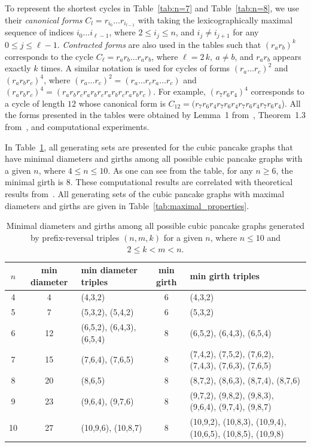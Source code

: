 \documentclass[
final
]{dmtcs-episciences}
\begin{document}
To represent the shortest cycles in Table~\ref{tab:n=7} and Table~\ref{tab:n=8}, we use their {\it canonical forms} $C_{l}=r_{i_0} \ldots r_{i_{l-1}}$ with taking the lexicographically maximal sequence of indices $i_0\ldots i_{\ell-1}$, where $2\leqslant i_j \leqslant n$, and $i_j \neq i_{j+1}$ for any $0\leqslant j \leqslant \ell-1$. {\it Contracted forms} are also used in the tables such that $(r_a r_b)^k$ corresponds to the cycle $C_\ell=r_a r_b\ldots r_a r_b$, where $\ell=2\,k, \ a\neq b$, and $r_a r_b$ appears exactly $k$ times. A similar notation is used for cycles of forms $(r_a\ldots r_c)^2$ and $(r_ar_br_c)^4$, where $(r_a\ldots r_c)^2=(r_a\ldots r_cr_a\ldots r_c)$ and $(r_ar_br_c)^4=(r_ar_br_cr_ar_br_cr_ar_br_cr_ar_br_c)$. For example, $(r_7r_6r_4)^4$ corresponds to a cycle of length $12$ whose canonical form is $C_{12}=(r_7r_6r_4r_7r_6r_4r_7r_6r_4r_7r_6r_4$). All the forms presented in the tables were obtained by Lemma~1 from~\cite{KM16}, Theorem~1.3 from~\cite{KM14}, and computational experiments.

In Table~\ref{tab:minimal_properties}, all generating sets are presented for the cubic pancake graphs that have minimal diameters and girths among all possible cubic pancake graphs with a given $n$, where $4\leqslant n \leqslant 10$. As one can see from the table, for any $n\geqslant 6$, the minimal girth is $8$. These computational results are correlated with theoretical results from~\cite{KS22}. All generating sets of the cubic pancake graphs with maximal diameters and girths are given in Table~\ref{tab:maximal_properties}.

\begin{table}[htbp]
\centering
\small
\setlength{\tabcolsep}{4pt}
\renewcommand{\arraystretch}{1.2}
\begin{tabular}{|c| c| >{\raggedright\arraybackslash}p{2.4cm}| c| >{\raggedright\arraybackslash}p{3.8cm}|}
\hline
$n$ & min diameter & min diameter triples & min girth & min girth triples \\
\hline
4 & 4 & (4,3,2) & 6 & (4,3,2) \newline \\ \hline
5 & 7 & (5,3,2), (5,4,2) & 6 & (5,3,2) \newline \\ \hline
6 & 12 & (6,5,2), (6,4,3), (6,5,4) & 8 & (6,5,2), (6,4,3), (6,5,4) \\ \hline
7 & 15 & (7,6,4), (7,6,5) & 8 & (7,4,2), (7,5,2), (7,6,2), (7,4,3), (7,6,3), (7,6,5) \\ \hline
8 & 20 & (8,6,5) & 8 & (8,7,2), (8,6,3), (8,7,4), (8,7,6) \\ \hline
9 & 23 & (9,6,4), (9,7,6) & 8 & (9,7,2), (9,8,2), (9,8,3), (9,6,4), (9,7,4), (9,8,7) \\ \hline
10 & 27 & (10,9,6), (10,8,7) & 8 & (10,9,2), (10,8,3), (10,9,4), (10,6,5), (10,8,5), (10,9,8) \\
\hline
\end{tabular}
\caption{Minimal diameters and girths among all possible cubic pancake graphs generated by prefix-reversal triples $(n,m,k)$ for a given $n$, where $n \leqslant 10$ and $2\leqslant k < m < n$.}
\label{tab:minimal_properties}
\end{table}
\end{document}
